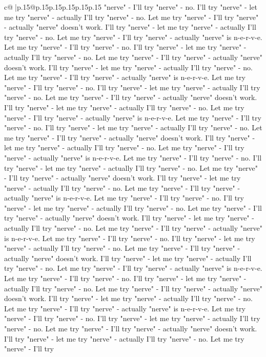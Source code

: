 \documentclass{article}
\begin{document}
{\begin{supertabular}{c@{$\;$}|p{.15\linewidth}@{}p{.15\linewidth}p{.15\linewidth}p{.15\linewidth}p{.15\linewidth}p{.15\linewidth}}
{{{"nerve" {-} I'll try "nerve" {-} no. I'll try "nerve" {-} let me try "nerve" {-} actually I'll try "nerve" {-} no. Let me try "nerve" {-} I'll try "nerve" {-} actually "nerve" doesn't work. I'll try "nerve" {-} let me try "nerve" {-} actually I'll try "nerve" {-} no. Let me try "nerve" {-} I'll try "nerve" {-} actually "nerve" is n{-}e{-}r{-}v{-}e. Let me try "nerve" {-} I'll try "nerve" {-} no. I'll try "nerve" {-} let me try "nerve" {-} actually I'll try "nerve" {-} no. Let me try "nerve" {-} I'll try "nerve" {-} actually "nerve" doesn't work. I'll try "nerve" {-} let me try "nerve" {-} actually I'll try "nerve" {-} no. Let me try "nerve" {-} I'll try "nerve" {-} actually "nerve" is n{-}e{-}r{-}v{-}e. Let me try "nerve" {-} I'll try "nerve" {-} no. I'll try "nerve" {-} let me try "nerve" {-} actually I'll try "nerve" {-} no. Let me try "nerve" {-} I'll try "nerve" {-} actually "nerve" doesn't work. I'll try "nerve" {-} let me try "nerve" {-} actually I'll try "nerve" {-} no. Let me try "nerve" {-} I'll try "nerve" {-} actually "nerve" is n{-}e{-}r{-}v{-}e. Let me try "nerve" {-} I'll try "nerve" {-} no. I'll try "nerve" {-} let me try "nerve" {-} actually I'll try "nerve" {-} no. Let me try "nerve" {-} I'll try "nerve" {-} actually "nerve" doesn't work. I'll try "nerve" {-} let me try "nerve" {-} actually I'll try "nerve" {-} no. Let me try "nerve" {-} I'll try "nerve" {-} actually "nerve" is n{-}e{-}r{-}v{-}e. Let me try "nerve" {-} I'll try "nerve" {-} no. I'll try "nerve" {-} let me try "nerve" {-} actually I'll try "nerve" {-} no. Let me try "nerve" {-} I'll try "nerve" {-} actually "nerve" doesn't work. I'll try "nerve" {-} let me try "nerve" {-} actually I'll try "nerve" {-} no. Let me try "nerve" {-} I'll try "nerve" {-} actually "nerve" is n{-}e{-}r{-}v{-}e. Let me try "nerve" {-} I'll try "nerve" {-} no. I'll try "nerve" {-} let me try "nerve" {-} actually I'll try "nerve" {-} no. Let me try "nerve" {-} I'll try "nerve" {-} actually "nerve" doesn't work. I'll try "nerve" {-} let me try "nerve" {-} actually I'll try "nerve" {-} no. Let me try "nerve" {-} I'll try "nerve" {-} actually "nerve" is n{-}e{-}r{-}v{-}e. Let me try "nerve" {-} I'll try "nerve" {-} no. I'll try "nerve" {-} let me try "nerve" {-} actually I'll try "nerve" {-} no. Let me try "nerve" {-} I'll try "nerve" {-} actually "nerve" doesn't work. I'll try "nerve" {-} let me try "nerve" {-} actually I'll try "nerve" {-} no. Let me try "nerve" {-} I'll try "nerve" {-} actually "nerve" is n{-}e{-}r{-}v{-}e. Let me try "nerve" {-} I'll try "nerve" {-} no. I'll try "nerve" {-} let me try "nerve" {-} actually I'll try "nerve" {-} no. Let me try "nerve" {-} I'll try "nerve" {-} actually "nerve" doesn't work. I'll try "nerve" {-} let me try "nerve" {-} actually I'll try "nerve" {-} no. Let me try "nerve" {-} I'll try "nerve" {-} actually "nerve" is n{-}e{-}r{-}v{-}e. Let me try "nerve" {-} I'll try "nerve" {-} no. I'll try "nerve" {-} let me try "nerve" {-} actually I'll try "nerve" {-} no. Let me try "nerve" {-} I'll try "nerve" {-} actually "nerve" doesn't work. I'll try "nerve" {-} let me try "nerve" {-} actually I'll try "nerve" {-} no. Let me try "nerve" {-} I'll try }}}
\end{supertabular}}
\end{document}
